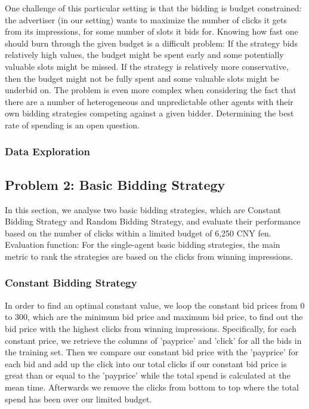 \documentclass{sig-alternate-05-2015}
\begin{document}

One challenge of this particular setting is that the bidding is budget constrained: 
the advertiser (in our setting) wants to maximize the number of clicks it gets from its impressions, for some number of slots it bids for.
Knowing how fast one should burn through the given budget is a difficult problem\cite{BID1}:
If the strategy bids relatively high values, the budget might be spent early and some potentially valuable slots might be missed.
If the strategy is relatively more conservative, then the budget might not be fully spent and some valuable slots might be underbid on.
The problem is even more complex when considering the fact that there are a number of heterogeneous and unpredictable other agents with their own bidding strategies competing against a given bidder. \cite{BID1}
Determining the best rate of spending is an open question. \cite{OPENQ}



\subsubsection{Data Exploration}



\subsection{Problem 2: Basic Bidding Strategy}
In this section, we analyse two basic bidding strategies, which are Constant Bidding Strategy and Random Bidding Strategy, and evaluate their performance based on the number of clicks within a limited budget of 6,250 CNY fen. 
Evaluation function: For the single-agent basic bidding strategies, the main metric to rank the strategies are based on the clicks from winning impressions.

\subsubsection{Constant Bidding Strategy}
In order to find an optimal constant value, we loop the constant bid prices from 0 to 300, which are the minimum bid price and maximum bid price, to find out the bid price with the highest clicks from winning impressions. Specifically, for each constant price, we retrieve the columns of 'payprice' and 'click' for all the bids in the training set. Then we compare our constant bid price with the 'payprice' for each bid and add up the click into our total clicks if our constant bid price is great than or equal to the 'payprice' while the total spend is calculated at the mean time. Afterwards we remove the clicks from bottom to top where the total spend has been over our limited budget.
\end{document}

